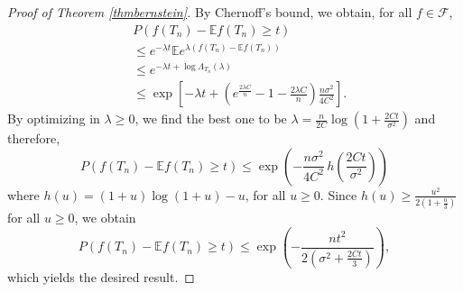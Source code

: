 \documentclass[10pt,a4paper]{article}
\theoremstyle{plain}
\theoremstyle{definition}
\theoremstyle{remark}
\newcommand{\E}{\mathbb{E}}
\newcommand{\var}{\mathrm{Var}}
\begin{document}
\begin{proof}[Proof of Theorem \ref{thmbernstein}]





By Chernoff's bound, we obtain, for all $f\in\mathcal F$,
\begin{align*}
& P\left( f(T_n)-\E f(T_n)\geq t \right)\\
& \leq e^{-\lambda t}\E e^{\lambda(f(T_n)-\E f(T_n))}\\
&\leq e^{-\lambda t + \log\Lambda_{T_n}(\lambda)}\\
&\leq \exp\left[-\lambda t + \left(e^{\frac{2\lambda C}{n}} -1 -\frac{2\lambda C}{n}\right)\frac{n\sigma^2}{4C^2}\right].
\end{align*}
By optimizing in $\lambda\geq 0$, we find the best one to be $\lambda=\frac{n}{2C}\log\left(1+\frac{2Ct}{\sigma^2}\right)$ and therefore,
$$P\left( f(T_n)-\E f(T_n)\geq t \right) \leq \exp\left(-\frac{n\sigma^2}{4C^2}\, h\left(\frac{2Ct}{\sigma^2}\right)\right)$$
where $h(u)=(1+u)\log(1+u) -u$, for all $u\geq 0$.
Since $h(u)\geq \frac{u^2}{2(1+\frac{u}{3})}$ for all $u\geq 0$, we obtain
$$P\left( f(T_n)-\E f(T_n)\geq t \right) \leq \exp\left(-\frac{nt^2}{2(\sigma^2+\frac{2Ct}{3})} \right),$$
which yields the desired result.
\end{proof}
\end{document}
